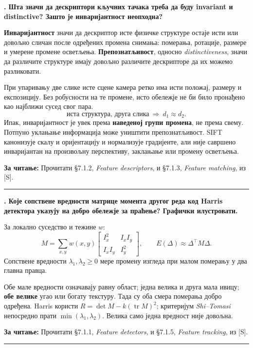 \documentclass[10pt,a4paper]{article}
\newcommand{\en}[1]{\textit{#1}}
\newcounter{pitanje}
\newenvironment{odgovor}[1]{\stepcounter{pitanje}\begin{minipage}[t][0.455\textheight][t]{\textwidth}\vspace{0pt}\textbf{\thepitanje. #1}\par\smallskip}{\end{minipage}\par\ifodd\value{pitanje}\vspace{0.025\textheight}\hrule\vspace{0.015\textheight}\else\newpage\fi}
\newcommand{\izvor}[1]{\par\vfill{\footnotesize\textbf{За читање:} #1}\par}
\begin{document}
\begin{odgovor}{Шта значи да дескриптори кључних тачака треба да буду invariant и distinctive? Зашто је инваријантност неопходна?}
\textbf{Инваријантност} значи да дескриптор исте физичке структуре остаје исти или довољно сличан после одређених промена снимања: померања, ротације, размере и умерене промене осветљења. \textbf{Препознатљивост}, односно \en{distinctiveness}, значи да различите структуре имају довољно различите дескрипторе да их можемо разликовати.

При упаривању две слике исте сцене камера ретко има исти положај, размеру и експозицију. Без робусности на те промене, исто обележје не би било пронађено као најближи сусед свог пара.
\[
\text{иста структура, друга слика}\ \Rightarrow\ d_1\approx d_2.
\]
Ипак, инваријантност је увек према \textbf{наведеној групи промена}, не према свему. Потпуно уклањање информација може уништити препознатљивост. SIFT канонизује скалу и оријентацију и нормализује градијенте, али није савршено инваријантан на произвољну перспективу, заклањање или промену осветљења.
\izvor{Прочитати §7.1.2, \en{Feature descriptors}, и §7.1.3, \en{Feature matching}, из [S].}
\end{odgovor}

\begin{odgovor}{Које сопствене вредности матрице момента другог реда код Harris детектора указују на добро обележје за праћење? Графички илустровати.}
За локално суседство и тежине $w$:
\[
M=\sum_{x,y}w(x,y)
\begin{bmatrix}I_x^2&I_xI_y\\I_xI_y&I_y^2\end{bmatrix},\qquad
E(\Delta)\approx\Delta^\top M\Delta.
\]
Сопствене вредности $\lambda_1,\lambda_2\geq0$ мере промену изгледа при малом померању у два главна правца.
\begin{center}\end{center}
Обе мале вредности означавају равну област; једна велика и друга мала ивицу; \textbf{обе велике} угао или богату текстуру. Тада су оба смера померања добро одређена. Harris користи $R=\det M-k(\operatorname{tr}M)^2$; критеријум \en{Shi--Tomasi} непосредно прати $\min(\lambda_1,\lambda_2)$. Велика само једна вредност није довољна.
\izvor{Прочитати §7.1.1, \en{Feature detectors}, и §7.1.5, \en{Feature tracking}, из [S].}
\end{odgovor}
\end{document}
